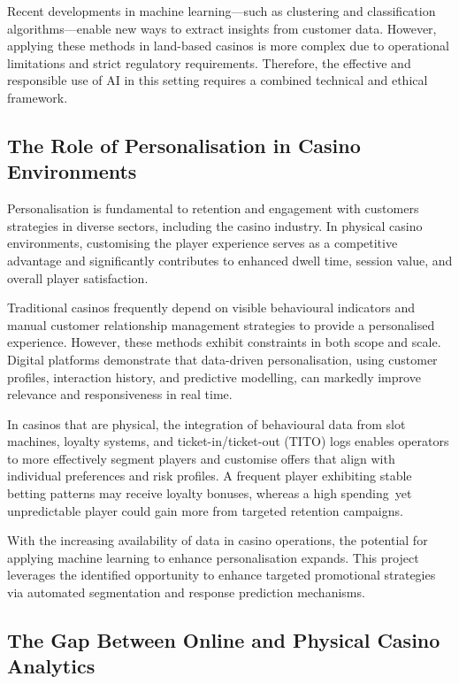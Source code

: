 \documentclass[12pt,a4paper]{report}
\begin{document}
Recent developments in machine learning—such as clustering and classification algorithms—enable new ways to extract insights from customer data. However, applying these methods in land-based casinos is more complex due to operational limitations and strict regulatory requirements. Therefore, the effective and responsible use of AI in this setting requires a combined technical and ethical framework.


\subsection{The Role of Personalisation in Casino Environments}

Personalisation is fundamental to retention and engagement with customers strategies in diverse sectors, including the casino industry.  In physical casino environments, customising the player experience serves as a competitive advantage and significantly contributes to enhanced dwell time, session value, and overall player satisfaction.

 Traditional casinos frequently depend on visible behavioural indicators and manual customer relationship management strategies to provide a personalised experience.  However, these methods exhibit constraints in both scope and scale.  Digital platforms demonstrate that data-driven personalisation, using customer profiles, interaction history, and predictive modelling, can markedly improve relevance and responsiveness in real time.


 In casinos that are physical, the integration of behavioural data from slot machines, loyalty systems, and ticket-in/ticket-out (TITO) logs enables operators to more effectively segment players and customise offers that align with individual preferences and risk profiles.  A frequent player exhibiting stable betting patterns may receive loyalty bonuses, whereas a high spending yet unpredictable player could gain more from targeted retention campaigns.

 With the increasing availability of data in casino operations, the potential for applying machine learning to enhance personalisation expands.  This project leverages the identified opportunity to enhance targeted promotional strategies via automated segmentation and response prediction mechanisms.


\subsection{The Gap Between Online and Physical Casino Analytics}
\end{document}
